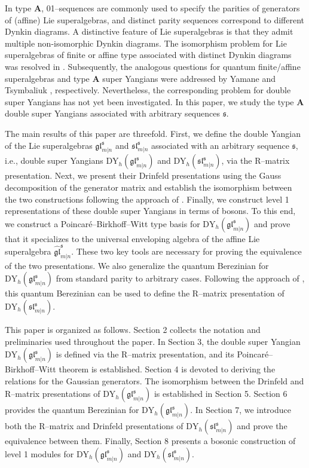\documentclass[a4paper,12pt]{article}
\numberwithin{equation}{section}
\begin{document}
In type $\boldsymbol{A}$, 01--sequences are commonly used to specify the parities of generators of (affine) Lie superalgebras, and distinct parity sequences correspond to different Dynkin diagrams. A distinctive feature of Lie superalgebras is that they admit multiple non-isomorphic Dynkin diagrams. The isomorphism problem for Lie superalgebras of finite or affine type associated with distinct Dynkin diagrams was resolved in \cite{LSS}. Subsequently, the analogous questions for quantum finite/affine superalgebras and type $\boldsymbol{A}$ super Yangians were addressed by Yamane \cite{Y99} and Tsymbaliuk \cite{T20}, respectively. Nevertheless, the corresponding problem for double super Yangians has not yet been investigated. In this paper, we study the type $\boldsymbol{A}$ double super Yangians associated with arbitrary sequences $\mathfrak{s}$.

The main results of this paper are threefold. First, we define the double Yangian of the Lie superalgebras $\mathfrak{gl}_{m|n}^{\mathfrak{s}}$ and $\mathfrak{sl}_{m|n}^{\mathfrak{s}}$ associated with an arbitrary sequence $\mathfrak{s}$, i.e., double super Yangians $\mathrm{DY}_{h}(\mathfrak{gl}_{m|n}^{\mathfrak{s}})$ and $\mathrm{DY}_{h}(\mathfrak{sl}_{m|n}^{\mathfrak{s}})$, via the R--matrix presentation. Next, we present their Drinfeld presentations using the Gauss decomposition of the generator matrix and establish the isomorphism between the two constructions following the approach of \cite{YJ24}. Finally, we construct level 1 representations of these double super Yangians in terms of bosons. To this end,  we construct a Poincar\'e--Birkhoff--Witt type basis for $\mathrm{DY}_{h}(\mathfrak{gl}_{m|n}^{\mathfrak{s}})$ and prove that it specializes to the universal enveloping algebra of the affine Lie superalgebra $\widehat{\mathfrak{gl}}^{\mathfrak{s}}_{m|n}$. These two key tools are necessary for proving the equivalence of the two presentations. We also generalize the quantum Berezinian for $\mathrm{DY}_{h}(\mathfrak{gl}_{m|n}^{\mathfrak{s}})$ from standard parity to arbitrary cases. Following the approach of \cite{XLZ}, this quantum Berezinian can be used to define the R--matrix presentation of $\mathrm{DY}_{h}(\mathfrak{sl}_{m|n}^{\mathfrak{s}})$. 

This paper is organized as follows. Section 2 collects the notation and preliminaries used throughout the paper. In Section 3, the double super Yangian $\mathrm{DY}_{h}(\mathfrak{gl}_{m|n}^{\mathfrak{s}})$ is defined via the R--matrix presentation, and its Poincar{\'e}--Birkhoff--Witt theorem is established. Section 4 is devoted to deriving the relations for the Gaussian generators. The isomorphism between the Drinfeld and R--matrix presentations of $\mathrm{DY}_{h}(\mathfrak{gl}_{m|n}^{\mathfrak{s}})$ is established in Section 5. Section 6 provides the quantum Berezinian for $\mathrm{DY}_{h}(\mathfrak{gl}_{m|n}^{\mathfrak{s}})$. In Section 7, we introduce both the R--matrix and Drinfeld presentations of $\mathrm{DY}_{h}(\mathfrak{sl}_{m|n}^{\mathfrak{s}})$ and prove the equivalence between them. Finally, Section 8 presents a bosonic construction of level 1 modules for $\mathrm{DY}_{h}(\mathfrak{gl}_{m|n}^{\mathfrak{s}})$ and $\mathrm{DY}_{h}(\mathfrak{sl}_{m|n}^{\mathfrak{s}})$. 
\end{document}
